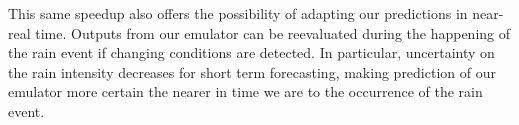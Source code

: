 This same speedup also offers the possibility of adapting our predictions in near-real time.
Outputs from our emulator can be reevaluated during the happening of the rain event if changing conditions are detected.
In particular, uncertainty on the rain intensity decreases for short term forecasting, making prediction of our emulator more certain the nearer in time we are to the occurrence of the rain event.




